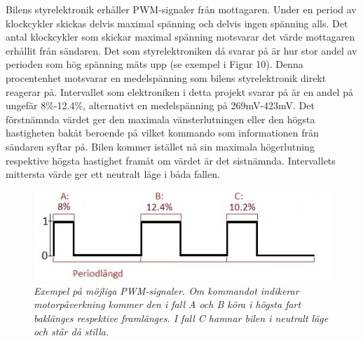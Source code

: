 \documentclass[a4paper]{article}
\begin{document}
Bilens styrelektronik erhåller PWM-signaler från mottagaren. Under en period av klockcykler skickas delvis maximal spänning och delvis ingen spänning alls. Det antal klockcykler som skickar maximal spänning motsvarar det värde mottagaren erhållit från sändaren. Det som styrelektroniken då svarar på är hur stor andel av perioden som hög spänning mäts upp (se exempel i Figur 10). Denna procentenhet motsvarar en medelspänning som bilens styrelektronik direkt reagerar på. Intervallet som elektroniken i detta projekt svarar på är en andel på ungefär 8\%-12.4\%, alternativt en medelspänning på 269mV-423mV. Det förstnämnda värdet ger den maximala vänsterlutningen eller den högsta hastigheten bakåt beroende på vilket kommando som informationen från sändaren syftar på. Bilen kommer istället nå sin maximala högerlutning respektive högsta hastighet framåt om värdet är det sistnämnda. Intervallets mittersta värde ger ett neutralt läge i båda fallen.


\begin{figure}[H]
\includegraphics[scale=1]{PWMsignals.jpg}
\centering
\caption{\it Exempel på möjliga PWM-signaler. Om kommandot indikerar motorpåverkning kommer den i fall A och B köra i högsta fart baklänges respektive framlänges. I fall C hamnar bilen i neutralt läge och står då stilla.}
\end{figure} 

\end{document}
